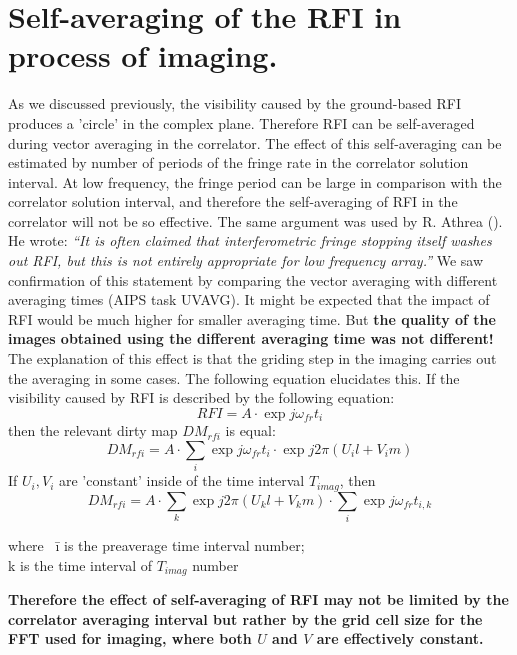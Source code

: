 \documentclass{article}
\begin{document}
\section{Self-averaging of the RFI in process of imaging.}
As we discussed previously, the visibility caused by the ground-based
RFI produces a 'circle' in the complex plane. Therefore RFI can be
self-averaged during vector averaging in the correlator. The effect of this
self-averaging can be estimated by number of periods of the fringe rate in
the correlator solution interval. At low frequency, the
fringe period can be large in comparison with the correlator solution
interval, and therefore the self-averaging of RFI in the correlator
will not be so effective.  The same argument was used by R. Athrea  (\cite{ram}).
He wrote: {\em ``It is often claimed that interferometric fringe
  stopping itself washes out RFI, but this is not entirely appropriate
  for low frequency array.''}
We saw confirmation of this statement by comparing the vector
averaging with different averaging times (AIPS task UVAVG). It might
be expected that
the impact of RFI would be much higher for smaller averaging time. But {\bf the
  quality of the images obtained using the different averaging time
  was not different!} The explanation of this effect is that the
griding step in the imaging carries out the averaging in some cases.
The following equation elucidates this.
If the visibility caused by RFI is described by the following equation:
\begin{equation}
      RFI = A \cdot \exp j\omega_{fr}t_i
        \label{eq:rfis}
\end{equation}
then the relevant dirty map $DM_{rfi}$ is equal:
\begin{equation}
   DM_{rfi} = A \cdot \sum_i \exp j\omega_{fr}t_i \cdot \exp j2\pi(U_il+V_im)
        \label{eq:dm}
\end{equation}
If $U_i, V_i$ are 'constant' inside of the time interval $T_{imag}$, then
\begin{equation}
   DM_{rfi} = A \cdot \sum_k \exp j2\pi(U_kl+V_km) \cdot \sum_i \exp j\omega_{fr}t_{i,k}
        \label{eq:dm1}
\end{equation}

\begin{tabbing}
where~  \=  i is the preaverage time interval number; \\
        \>  k is the time interval of $T_{imag}$ number \\
\end{tabbing}
{\bf Therefore the effect of self-averaging of RFI may not be limited
  by the correlator averaging interval but rather by the grid cell size for
  the FFT used for imaging, where both $U$ and $V$ are effectively constant.}
\end{document}
